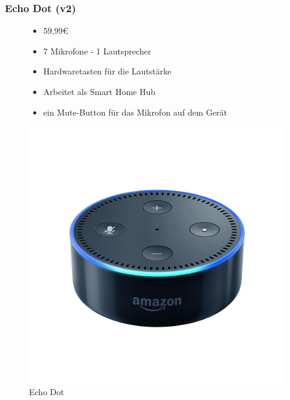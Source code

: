 \subsubsection{Echo Dot (v2)}
\begin{figure}[H]
	\begin{minipage}{0.45\textwidth}
		\begin{itemize}
			\item 59,99€
			\item 7 Mikrofone - 1 Lautsprecher
			\item Hardwaretasten für die Lautstärke
			\item Arbeitet als Smart Home Hub
			\item ein Mute-Button für das Mikrofon auf dem Gerät
		\end{itemize}
	\end{minipage}
	\hfill
	\begin{minipage}{0.45\textwidth}
		\centering
		\includegraphics[width=\textwidth]{content/img/echodot}
		\caption[Echo Dot]{Echo Dot}
	\end{minipage}
\end{figure}

